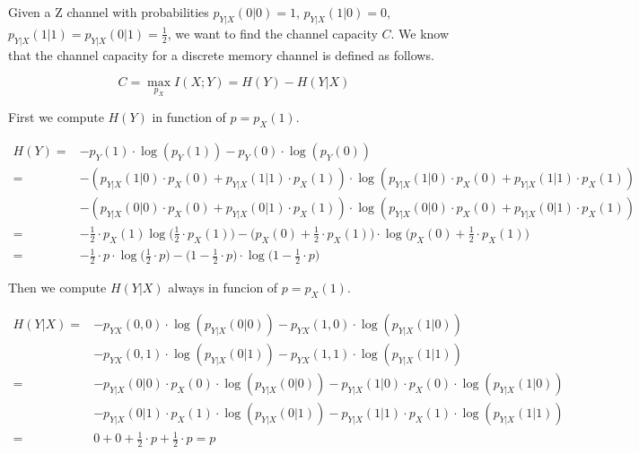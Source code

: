 
Given a Z channel with probabilities $p_{Y|X}(0|0)=1$, $p_{Y|X}(1|0)=0$, $p_{Y|X}(1|1)=p_{Y|X}(0|1)=\frac{1}{2}$, we want to find the channel capacity $C$. We know that the channel capacity for a discrete memory channel is defined as follows.

\begin{equation}
	C = \max_{p_X} I(X;Y) = H(Y)-H(Y|X)
\end{equation}

First we compute $H(Y)$ in function of $p=p_X(1)$.

\begin{equation}
\begin{aligned}
	H(Y)= & -p_Y(1)\cdot\log(p_Y(1))-p_Y(0)\cdot\log(p_Y(0)) \\
	= & -(p_{Y|X}(1|0) \cdot p_X(0) + p_{Y|X}(1|1) \cdot p_X(1)) \cdot\log(p_{Y|X}(1|0) \cdot p_X(0) + p_{Y|X}(1|1) \cdot p_X(1)) \\ & -(p_{Y|X}(0|0) \cdot p_X(0) + p_{Y|X}(0|1) \cdot p_X(1)) \cdot\log(p_{Y|X}(0|0) \cdot p_X(0) + p_{Y|X}(0|1) \cdot p_X(1)) \\
	= & -\frac{1}{2}\cdot p_X(1)\log\Big(\frac{1}{2}\cdot p_X(1)\Big)-\Big(p_X(0)+\frac{1}{2}\cdot p_X(1)\Big)\cdot \log \Big(p_X(0)+\frac{1}{2}\cdot p_X(1)\Big) \\
	= & -\frac{1}{2}\cdot p \cdot \log\Big(\frac{1}{2}\cdot p\Big)-\Big(1-\frac{1}{2}\cdot p\Big)\cdot \log \Big(1-\frac{1}{2}\cdot p\Big)
\end{aligned}
\end{equation}

Then we compute $H(Y|X)$ always in funcion of $p=p_X(1)$.

\begin{equation}
\begin{aligned}
	H(Y|X) = & -p_{YX}(0,0) \cdot \log (p_{Y|X}(0|0)) -p_{YX}(1,0) \cdot \log (p_{Y|X}(1|0)) \\
	& -p_{YX}(0,1) \cdot \log (p_{Y|X}(0|1)) -p_{YX}(1,1) \cdot \log (p_{Y|X}(1|1)) \\ =
	& -p_{Y|X}(0|0) \cdot p_X(0) \cdot \log (p_{Y|X}(0|0)) -p_{Y|X}(1|0) \cdot p_X(0) \cdot \log (p_{Y|X}(1|0)) \\
	& -p_{Y|X}(0|1) \cdot p_X(1) \cdot \log (p_{Y|X}(0|1)) -p_{Y|X}(1|1) \cdot p_X(1) \cdot \log (p_{Y|X}(1|1)) \\ =	& 0 + 0 + \frac{1}{2} \cdot p + \frac{1}{2} \cdot p = p
\end{aligned}
\end{equation}

